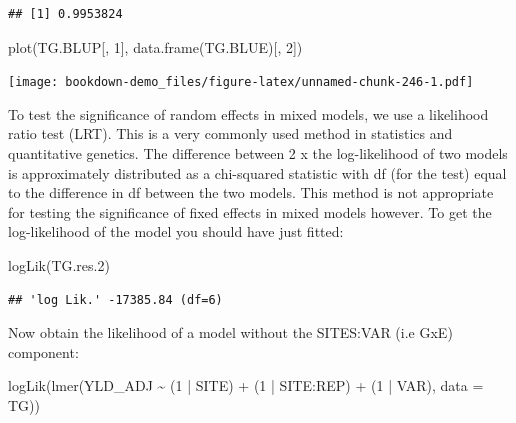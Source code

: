 \documentclass[
]{book}
\newenvironment{Shaded}{\begin{snugshade}}{\end{snugshade}}
\newcommand{\AttributeTok}[1]{\textcolor[rgb]{0.77,0.63,0.00}{#1}}
\newcommand{\DecValTok}[1]{\textcolor[rgb]{0.00,0.00,0.81}{#1}}
\newcommand{\FloatTok}[1]{\textcolor[rgb]{0.00,0.00,0.81}{#1}}
\newcommand{\FunctionTok}[1]{\textcolor[rgb]{0.00,0.00,0.00}{#1}}
\newcommand{\NormalTok}[1]{#1}
\newcommand{\SpecialCharTok}[1]{\textcolor[rgb]{0.00,0.00,0.00}{#1}}
\begin{document}
\begin{verbatim}
## [1] 0.9953824
\end{verbatim}

\begin{Shaded}
\begin{Highlighting}[]
\FunctionTok{plot}\NormalTok{(TG.BLUP[, }\DecValTok{1}\NormalTok{], }\FunctionTok{data.frame}\NormalTok{(TG.BLUE)[, }\DecValTok{2}\NormalTok{])}
\end{Highlighting}
\end{Shaded}

\texttt{[image: bookdown-demo\_files/figure-latex/unnamed-chunk-246-1.pdf]}

To test the significance of random effects in mixed models, we use a likelihood ratio test (LRT). This is a very commonly used method in statistics and quantitative genetics. The difference between 2 x the log-likelihood of two models is approximately distributed as a chi-squared statistic with df (for the test) equal to the difference in df between the two models. This method is not appropriate for testing the significance of fixed effects in mixed models however. To get the log-likelihood of the model you should have just fitted:

\begin{Shaded}
\begin{Highlighting}[]
\FunctionTok{logLik}\NormalTok{(TG.res}\FloatTok{.2}\NormalTok{)}
\end{Highlighting}
\end{Shaded}

\begin{verbatim}
## 'log Lik.' -17385.84 (df=6)
\end{verbatim}

Now obtain the likelihood of a model without the SITES:VAR (i.e GxE) component:

\begin{Shaded}
\begin{Highlighting}[]
\FunctionTok{logLik}\NormalTok{(}\FunctionTok{lmer}\NormalTok{(YLD\_ADJ }\SpecialCharTok{\textasciitilde{}}\NormalTok{ (}\DecValTok{1} \SpecialCharTok{|}\NormalTok{ SITE) }\SpecialCharTok{+}\NormalTok{ (}\DecValTok{1} \SpecialCharTok{|}\NormalTok{ SITE}\SpecialCharTok{:}\NormalTok{REP) }\SpecialCharTok{+}\NormalTok{ (}\DecValTok{1} \SpecialCharTok{|}\NormalTok{ VAR), }
    \AttributeTok{data =}\NormalTok{ TG))}
\end{Highlighting}
\end{Shaded}
\end{document}

